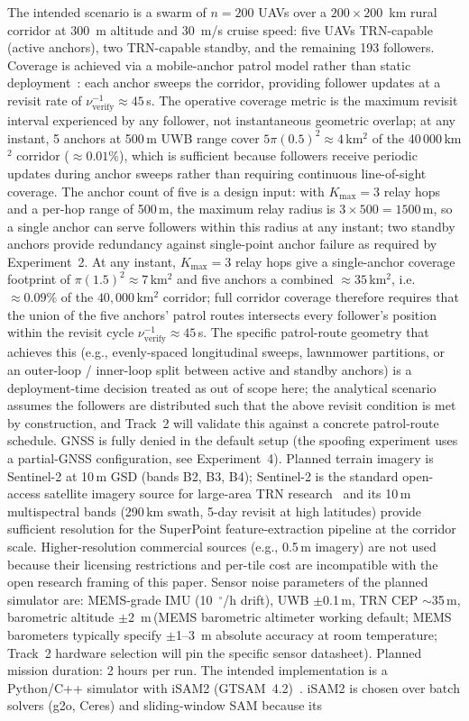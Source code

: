 \documentclass[conference,10pt]{IEEEtran}
\begin{document}
The intended scenario is a swarm of $n=200$ UAVs over a $200\times 200$~km rural corridor at 300~m altitude and 30~m/s cruise speed: five UAVs TRN-capable (active anchors), two TRN-capable standby, and the remaining 193 followers. Coverage is achieved via a mobile-anchor patrol model rather than static deployment~\cite{he2003rangefree}: each anchor sweeps the corridor, providing follower updates at a revisit rate of $\nu_\text{verify}^{-1}\approx 45$\,s. The operative coverage metric is the maximum revisit interval experienced by any follower, not instantaneous geometric overlap; at any instant, 5 anchors at 500\,m UWB range cover $5\pi(0.5)^2\approx 4$\,km$^2$ of the 40\,000\,km$^2$ corridor ($\approx 0.01\%$), which is sufficient because followers receive periodic updates during anchor sweeps rather than requiring continuous line-of-sight coverage. The anchor count of five is a design input: with $K_\text{max}=3$ relay hops and a per-hop range of 500\,m, the maximum relay radius is $3 \times 500 = 1500$\,m, so a single anchor can serve followers within this radius at any instant; two standby anchors provide redundancy against single-point anchor failure as required by Experiment~2. At any instant, $K_\text{max}=3$ relay hops give a single-anchor coverage footprint of $\pi(1.5)^2\approx 7$\,km$^2$ and five anchors a combined $\approx 35$\,km$^2$, i.e.\ $\approx 0.09\%$ of the $40{,}000$\,km$^2$ corridor; full corridor coverage therefore requires that the union of the five anchors' patrol routes intersects every follower's position within the revisit cycle $\nu_\text{verify}^{-1}\approx 45$\,s. The specific patrol-route geometry that achieves this (e.g., evenly-spaced longitudinal sweeps, lawnmower partitions, or an outer-loop / inner-loop split between active and standby anchors) is a deployment-time decision treated as out of scope here; the analytical scenario assumes the followers are distributed such that the above revisit condition is met by construction, and Track~2 will validate this against a concrete patrol-route schedule. GNSS is fully denied in the default setup (the spoofing experiment uses a partial-GNSS configuration, see Experiment~4). Planned terrain imagery is Sentinel-2 at 10\,m GSD (bands B2, B3, B4); Sentinel-2 is the standard open-access satellite imagery source for large-area TRN research~\cite{drusch2012sentinel} and its 10\,m multispectral bands (290\,km swath, 5-day revisit at high latitudes) provide sufficient resolution for the SuperPoint feature-extraction pipeline at the corridor scale. Higher-resolution commercial sources (e.g., 0.5\,m imagery) are not used because their licensing restrictions and per-tile cost are incompatible with the open research framing of this paper. Sensor noise parameters of the planned simulator are: MEMS-grade IMU (10~$^\circ$/h drift), UWB $\pm$0.1\,m, TRN CEP $\sim$35\,m, barometric altitude $\pm$2~m\,(MEMS barometric altimeter working default; MEMS barometers typically specify $\pm$1--3~m absolute accuracy at room temperature; Track~2 hardware selection will pin the specific sensor datasheet). Planned mission duration: 2 hours per run. The intended implementation is a Python/C++ simulator with iSAM2 (GTSAM~4.2)~\cite{kaess2012isam2}. iSAM2 is chosen over batch solvers (g2o, Ceres) and sliding-window SAM because its 
\end{document}
